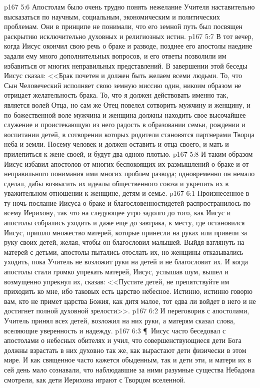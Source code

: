 \vs p167 5:6 Апостолам было очень трудно понять нежелание Учителя наставительно высказаться по научным, социальным, экономическим и политических проблемам. Они в принципе не понимали, что его земной путь был посвящен раскрытию исключительно духовных и религиозных истин.
\vs p167 5:7 В тот вечер, когда Иисус окончил свою речь о браке и разводе, позднее его апостолы наедине задали ему много дополнительных вопросов, и его ответы позволили им избавиться от многих неправильных представлений. В завершении этой беседы Иисус сказал: <<Брак почетен и должен быть желаем всеми людьми. То, что Сын Человеческий исполняет свою земную миссию один, никоим образом не отрицает желательность брака. То, что я должен действовать именно так, является волей Отца, но сам же Отец повелел сотворить мужчину и женщину, и по божественной воле мужчина и женщина должны находить свое высочайшее служение и проистекающую из него радость в образовании семьи, рождении и воспитании детей, в сотворении которых родители становятся партнерами Творца неба и земли. Посему человек и должен оставить и отца своего, и мать и прилепиться к жене своей, и будут два одною плотью.
\vs p167 5:8 И таким образом Иисус избавил апостолов от многих беспокоящих их размышлений о браке и от неправильного понимания ими многих проблем развода; одновременно он немало сделал, дабы возвысить их идеалы общественного союза и укрепить их в уважительном отношении к женщине, детям и семье.
\vs p167 6:1 Произнесенное в ту ночь послание Иисуса о браке и благословенностидетей распространилось по всему Иерихону, так что на следующее утро задолго до того, как Иисус и апостолы собрались уходить и даже еще до завтрака, к месту, где остановился Иисус, пришло множество матерей, которые принесли на руках или привели за руку своих детей, желая, чтобы он благословил малышей. Выйдя взглянуть на матерей с детьми, апостолы пытались отослать их, но женщины отказывались уходить, пока Учитель не возложит руки на детей и не благословит их. И когда апостолы стали громко упрекать матерей, Иисус, услышав шум, вышел и возмущенно упрекнул их, сказав: <<Пустите детей, не препятствуйте им приходить ко мне, ибо таковых есть царство небесное. Истинно, истинно говорю вам, кто не примет царства Божия, как дитя малое, тот едва ли войдет в него и не достигнет полной духовной зрелости>>.
\vs p167 6:2 И переговорив с апостолами, Учитель принял всех детей, возложил на них руки, а матерям сказал слова, вселяющие уверенность и надежду.
\vs p167 6:3 \P\ Иисус часто беседовал с апостолами о небесных обителях и учил, что совершенствующиеся дети Бога должны взрастать в них духовно так же, как вырастают дети физически в этом мире. И как священное часто кажется обыденным, так и дети эти, и матери их в сей день мало сознавали, что наблюдавшие за ними разумные существа Небадона смотрели, как дети Иерихона играют с Творцом вселенной.
